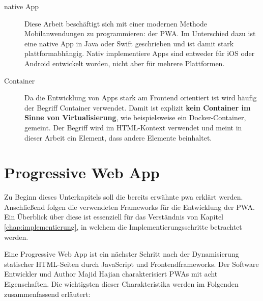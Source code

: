 \begin{description}
	\item [native App]
		Diese Arbeit beschäftigt sich mit einer modernen Methode Mobilanwendungen zu programmieren: der PWA. Im Unterschied dazu ist eine native App in Java oder Swift geschrieben und ist damit stark plattformabhängig. Nativ implementiere Apps sind entweder für iOS oder Android entwickelt worden, nicht aber für mehrere Plattformen.
		
	\item [Container]
		Da die Entwicklung von Apps stark am Frontend orientiert ist wird häufig der Begriff Container verwendet. Damit ist explizit \textbf{kein Container im Sinne von Virtualisierung}, wie beispielsweise ein Docker-Container, gemeint. Der Begriff wird im HTML-Kontext verwendet und meint in dieser Arbeit ein Element, dass andere Elemente beinhaltet.
	
\end{description}

\section{Progressive Web App}
\label{chap:pwa}

Zu Beginn dieses Unterkapitels soll die bereits erwähnte \acf{pwa} erklärt werden. Anschließend folgen die verwendeten Frameworks für die Entwicklung der PWA. Ein Überblick über diese ist essenziell für das Verständnis von Kapitel \ref{chap:implementierung}, in welchem die Implementierungsschritte betrachtet werden.

Eine Progressive Web App ist ein nächster Schritt nach der Dynamisierung statischer HTML-Seiten durch JavaScript und Frontendframeworks. Der Software Entwickler und Author Majid Hajian charakterisiert PWAs mit acht Eigenschaften. Die wichtigsten dieser Charakteristika werden im Folgenden zusammenfassend erläutert:


